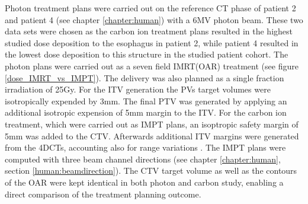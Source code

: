 Photon treatment plans were carried out on the reference CT phase of patient 2 and patient 4 (see chapter \ref{chapter:human}) with a 6MV 
photon beam. These two data sets were chosen as the carbon ion treatment plans resulted in the highest studied dose deposition to the esophagus 
in patient 2, while patient 4 resulted in the lowest dose deposition to this structure in the studied patient cohort. The photon plans were 
carried out as a seven field IMRT(OAR) treatment (see figure \ref{dose_IMRT_vs_IMPT}). The delivery was also planned as a single fraction 
irradiation of 25Gy. For the ITV generation the PVs target volumes were isotropically expended by 3mm. The final PTV was generated by applying 
an additional isotropic expension of 5mm margin to the ITV. For the carbon ion treatment, which were carried out as IMPT plans,  
an isoptropic safety margin of 5mm was added to the CTV. Afterwards additional ITV margins were generated from the 4DCTs, accounting also for 
range variations \cite{Gra12}. The IMPT plans were computed with three beam channel directions (see chapter \ref{chapter:human}, section 
\ref{human:beamdirection}). The CTV 
target volume as well as the contours of the OAR were kept identical in both photon and carbon study, enabling a direct comparison of the 
treatment planning outcome.


\newpage

